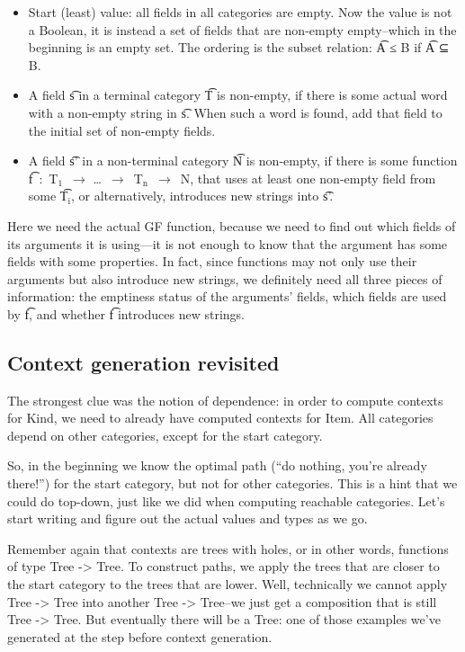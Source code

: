 \begin{itemize}
\item Start (least) value: all fields in all categories are empty. Now
  the value is not a Boolean, it is instead a set of fields that are
  non-empty empty–which in the beginning is an empty set. The ordering
  is the subset relation: \t{A ≤ B} if \t{A ⊆ B}.
\item A field \t{s} in a terminal category \t{T} is non-empty, if
  there is some actual word with a non-empty string in \t{s}. When
  such a word is found, add that field to the initial set of non-empty
  fields.
\item A field \t{s'} in a non-terminal category \t{N} is non-empty, if
  there is some function \t{f~:~T$_\text{1}$~$\rightarrow$
    \dots~$\rightarrow$~T$_\text{n}$~$\rightarrow$~N}, that uses at
  least one non-empty field from some \t{T$_\text{i}$}, or
  alternatively, introduces new strings into \t{s'}.
\end{itemize}

Here we need the actual GF function, because we need to find out which
fields of its arguments it is using---it is not enough to know that
the argument has some fields with some properties. In fact, since
functions may not only use their arguments but also introduce new
strings, we definitely need all three pieces of information: the
emptiness status of the arguments’ fields, which fields are used by
\t{f}, and whether \t{f} introduces new strings.

\subsection{Context generation revisited}

The strongest clue was the notion of dependence: in order to compute
contexts for Kind, we need to already have computed contexts for
Item. All categories depend on other categories, except for the start
category.

So, in the beginning we know the optimal path (“do nothing, you’re
already there!”) for the start category, but not for other
categories. This is a hint that we could do top-down, just like we did
when computing reachable categories. Let’s start writing and figure
out the actual values and types as we go.

Remember again that contexts are trees with holes, or in other words,
functions of type Tree -> Tree. To construct paths, we apply the trees
that are closer to the start category to the trees that are
lower. Well, technically we cannot apply Tree -> Tree into another Tree
-> Tree–we just get a composition that is still Tree -> Tree. But
eventually there will be a Tree: one of those examples we’ve generated
at the step before context generation.

